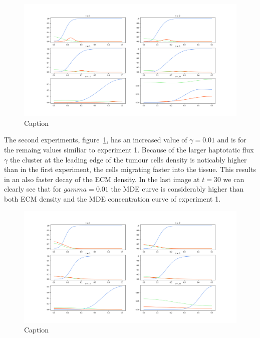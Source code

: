 \begin{figure}
    \centering
    \includegraphics[width=\textwidth]{resources/images/0.001_0.001_0.001_10_0.1_0_0.01_0_0.png}
    \caption{Caption}
    \label{fig:0.001_0.001_0.001_10_0.1_0_0.01_0_0}
\end{figure}

The second experiments, figure~\ref{fig:0.001_0.001_0.001_10_0.1_0_0.01_0_0}, has an increased value of $\gamma = 0.01$ and is for the remaing values similiar to experiment 1. Because of the larger haptotatic flux $\gamma$ the cluster at the leading edge of the tumour cells density is noticably higher than in the first experiment, the cells migrating faster into the tissue. This results in an also faster decay of the ECM density. In the last image at $t = 30$ we can clearly see that for $gamma = 0.01$ the MDE curve is considerably higher than both ECM density and the MDE concentration curve of experiment 1. 

\begin{figure}
    \centering
    \includegraphics[width=\textwidth]{resources/images/0.001_0.001_0.001_10_0.1_0_0.001_0_0.png}
    \caption{Caption}
    \label{fig:0.001_0.001_0.001_10_0.1_0_0.001_0_0}
\end{figure}

